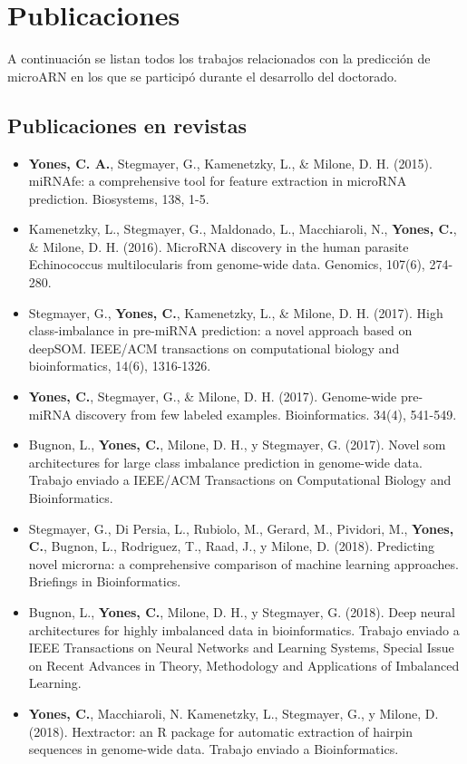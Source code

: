 \chapter{Publicaciones}
A continuación se listan todos los trabajos relacionados con la predicción de microARN en los que se participó durante el desarrollo del doctorado.

\section*{Publicaciones en revistas}
\begin{itemize}
	\item \textbf{Yones, C. A.}, Stegmayer, G., Kamenetzky, L., \& Milone, D. H. (2015). miRNAfe: a comprehensive tool for feature extraction in microRNA
		prediction. Biosystems, 138, 1-5.
	\item Kamenetzky, L., Stegmayer, G., Maldonado, L., Macchiaroli, N., \textbf{Yones, C.}, \& Milone, D. H. (2016). MicroRNA discovery in the human
		parasite Echinococcus multilocularis from genome-wide data. Genomics, 107(6), 274-280.
	\item Stegmayer, G., \textbf{Yones, C.}, Kamenetzky, L., \& Milone, D. H. (2017). High class-imbalance in pre-miRNA prediction: a novel approach based
		on deepSOM. IEEE/ACM transactions on computational biology and bioinformatics, 14(6), 1316-1326.
	\item \textbf{Yones, C.}, Stegmayer, G., \& Milone, D. H. (2017). Genome-wide pre-miRNA discovery from few labeled examples. Bioinformatics. 34(4),
		541-549.
	\item Bugnon, L., \textbf{Yones, C.}, Milone, D. H., y Stegmayer, G. (2017). Novel som architectures for large class imbalance prediction in genome-wide
		data. Trabajo enviado a IEEE/ACM Transactions on Computational Biology and Bioinformatics.
	\item Stegmayer, G., Di Persia, L., Rubiolo, M., Gerard, M., Pividori, M., \textbf{Yones, C.}, Bugnon, L., Rodriguez, T., Raad, J., y Milone, D. (2018).
		Predicting novel microrna: a comprehensive comparison of machine learning approaches. Briefings in Bioinformatics.
	\item Bugnon, L., \textbf{Yones, C.}, Milone, D. H., y Stegmayer, G. (2018). Deep neural architectures for highly imbalanced data in bioinformatics.
		Trabajo enviado a IEEE Transactions on Neural Networks and Learning Systems, Special Issue on Recent Advances in Theory, Methodology and
		Applications of Imbalanced Learning.
	\item \textbf{Yones, C.}, Macchiaroli, N. Kamenetzky, L., Stegmayer, G., y Milone, D. (2018). Hextractor: an R package for automatic extraction of
		hairpin sequences in genome-wide data. Trabajo enviado a Bioinformatics.
\end{itemize}

